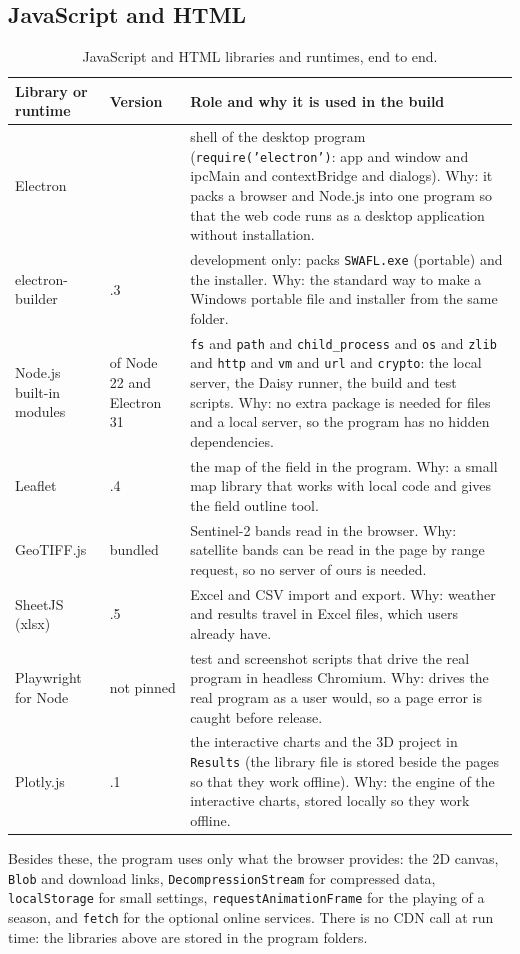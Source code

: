 \subsection{JavaScript and HTML}
\begin{table}[H]\centering\small
\caption{JavaScript and HTML libraries and runtimes, end to end.}\label{tab:js}
\begin{tabular}{@{}>{\raggedright\arraybackslash}p{3.1cm}>{\raggedright\arraybackslash}p{1.9cm}>{\raggedright\arraybackslash}p{7.9cm}@{}}
\toprule Library or runtime & Version & Role and why it is used in the build\\\midrule
Electron & 31 & shell of the desktop program (\texttt{require('electron')}: app and window and ipcMain and contextBridge and dialogs). Why: it packs a browser and Node.js into one program so that the web code runs as a desktop application without installation.\\
electron-builder & 24.13.3 & development only: packs \texttt{SWAFL.exe} (portable) and the installer. Why: the standard way to make a Windows portable file and installer from the same folder.\\
Node.js built-in modules & of Node 22 and Electron 31 & \texttt{fs} and \texttt{path} and \texttt{child\_process} and \texttt{os} and \texttt{zlib} and \texttt{http} and \texttt{vm} and \texttt{url} and \texttt{crypto}: the local server, the Daisy runner, the build and test scripts. Why: no extra package is needed for files and a local server, so the program has no hidden dependencies.\\
Leaflet & 1.9.4 & the map of the field in the program. Why: a small map library that works with local code and gives the field outline tool.\\
GeoTIFF.js & bundled & Sentinel-2 bands read in the browser. Why: satellite bands can be read in the page by range request, so no server of ours is needed.\\
SheetJS (xlsx) & 0.18.5 & Excel and CSV import and export. Why: weather and results travel in Excel files, which users already have.\\
Playwright for Node & not pinned & test and screenshot scripts that drive the real program in headless Chromium. Why: drives the real program as a user would, so a page error is caught before release.\\
Plotly.js & 4.1.1 & the interactive charts and the 3D project in \texttt{Results} (the library file is stored beside the pages so that they work offline). Why: the engine of the interactive charts, stored locally so they work offline.\\
\bottomrule\end{tabular}\end{table}
Besides these, the program uses only what the browser provides: the 2D canvas, \texttt{Blob} and download links, \texttt{DecompressionStream} for compressed data, \texttt{localStorage} for small settings, \texttt{requestAnimationFrame} for the playing of a season, and \texttt{fetch} for the optional online services. There is no CDN call at run time: the libraries above are stored in the program folders.

